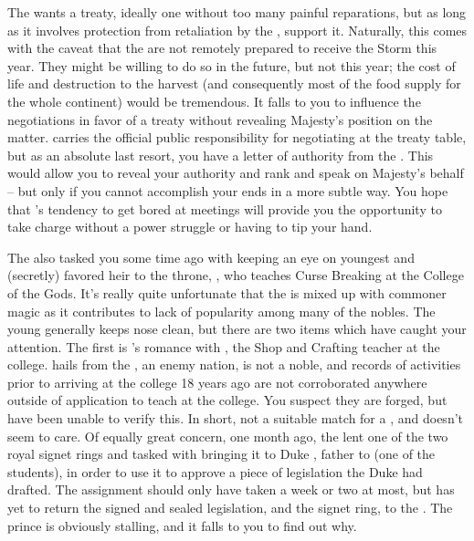\documentclass[char]{GL2020}
\begin{document}
The \cQueen{\Majesty} wants a treaty, ideally one without too many painful reparations, but as long as it involves protection from retaliation by the \pTech{}, \cQueen{\they} support it. Naturally, this comes with the caveat that the \pFarm{} are not remotely prepared to receive the Storm this year. They might be willing to do so in the future, but not this year; the cost of life and destruction to the harvest (and consequently most of the food supply for the whole continent) would be tremendous. It falls to you to influence the negotiations in favor of a treaty without revealing \cQueen{\Their} Majesty's position on the matter. \cEvil{} carries the official public responsibility for negotiating at the treaty table, but as an absolute last resort, you have a letter of authority from the \cQueen{\Majesty}. This would allow you to reveal your authority and rank and speak on \cQueen{\their} Majesty's behalf -- but only if you cannot accomplish your ends in a more subtle way. You hope that \cEvil{}'s tendency to get bored at meetings will provide you the opportunity to take charge without a power struggle or having to tip your hand.

The \cQueen{\Majesty} also tasked you some time ago with keeping an eye on \cQueen{\their} youngest \cPrince{\child} and (secretly) favored heir to the throne, \cPrince{\full}, who teaches Curse Breaking at the College of the Gods. It's really quite unfortunate that the \cPrince{\Heir} is mixed up with commoner magic as it contributes to \cPrince{\their} lack of popularity among many of the nobles. The young \cPrince{\heir} generally keeps \cPrince{\their} nose clean, but there are two items which have caught your attention. The first is \cPrince{}'s romance with \cPirate{\full}, the Shop and Crafting teacher at the college. \cPirate{} hails from the \pShip{}, an enemy nation, is not a noble, and records of \cPirate{\their} activities prior to arriving at the college 18 years ago are not corroborated anywhere outside of \cPirate{\their} application to teach at the college. You suspect they are forged, but have been unable to verify this. In short, \cPirate{\theyare} not a suitable match for a \cPrince{\heir}, and \cPrince{} doesn't seem to care. Of equally great concern, one month ago, the \cQueen{\Majesty} lent \cPrince{} one of the two royal signet rings and tasked \cPrince{\them} with bringing it to Duke \cChupStudent{\formal}, father to \cChupStudent{\full} (one of the students), in order to use it to approve a piece of legislation the Duke had drafted. The assignment should only have taken a week or two at most, but \cPrince{} has yet to return the signed and sealed legislation, and the signet ring, to the \cQueen{\Majesty}. The prince is obviously stalling, and it falls to you to find out why. 
\end{document}
